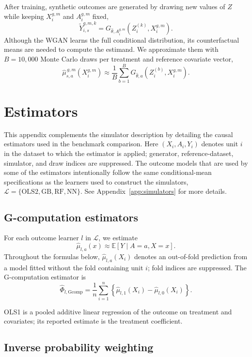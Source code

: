 \begin{landscape}
After training, synthetic outcomes are generated by drawing new values of \(Z\) while keeping \(X_i^{g,m}\) and \(A_i^{g,m}\) fixed,
\[
\widetilde Y_{i,s}^{g,m,k}
=
G_{\widehat{\theta},A_i^{g,m}}
\left(
Z_i^{(k)},X_i^{g,m}
\right).
\]
Although the WGAN learns the full conditional distribution, its counterfactual means are needed to compute the estimand. We approximate them with \(B=10{,}000\) Monte Carlo draws per treatment and reference covariate vector,
\[
\widehat{\mu}_{s,a}^{\,g,m}(X_i^{g,m})
\approx
\frac{1}{B}
\sum_{b=1}^{B}
G_{\widehat{\theta},a}
\left(
Z_i^{(b)},X_i^{g,m}
\right).
\]

\clearpage
\section{Estimators}
\label{app:estimators}

This appendix complements the simulator description by detailing the causal estimators used in the benchmark comparison. Here \((X_i,A_i,Y_i)\) denotes unit \(i\) in the dataset to which the estimator is applied; generator, reference-dataset, simulator, and draw indices are suppressed. The outcome models that are used by some of the estimators intentionally follow the same conditional-mean specifications as the learners used to construct the simulators, \(\mathcal L=\{\mathrm{OLS2},\mathrm{GB},\mathrm{RF},\mathrm{NN}\}\). See Appendix~\ref{app:simulators} for more details.

\subsection{G-computation estimators}

For each outcome learner \(l\) in \(\mathcal L\), we estimate
\[
\widehat{\mu}_{l,a}(x)
\approx
\mathbb E[Y\mid A=a,X=x].
\]
Throughout the formulas below, \(\widehat\mu_{l,a}(X_i)\) denotes an out-of-fold prediction from a model fitted without the fold containing unit \(i\); fold indices are suppressed.
The G-computation estimator is
\[
\widehat{\Phi}_{l,\mathrm{Gcomp}}
=
\frac{1}{n}
\sum_{i=1}^{n}
\left\{
\widehat{\mu}_{l,1}(X_i)
-
\widehat{\mu}_{l,0}(X_i)
\right\}.
\]

OLS1 is a pooled additive linear regression of the outcome on treatment and covariates; its reported estimate is the treatment coefficient.

\subsection{Inverse probability weighting}
\label{app:ipw}


\end{landscape}
